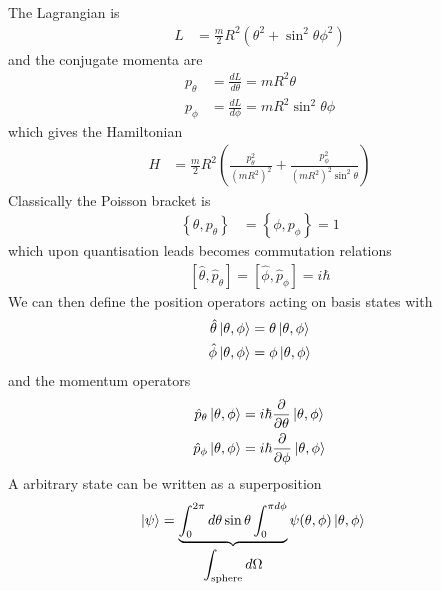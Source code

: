 \begin{example}
    The Lagrangian is
    \begin{align}
        L &=
        \frac{m}{2} R^2\left(
            \theta^2 + \sin^2\theta \phi^2
        \right)
    \end{align}
    and the conjugate momenta are
    \begin{align}
        p_\theta &=
        \frac{dL}{d\theta}
        = mR^2\theta\\
        p_\phi &=
        \frac{dL}{d\phi}
        = mR^2 \sin^2\theta \phi
    \end{align}
    which gives the Hamiltonian
    \begin{align}
        H &=
        \frac{m}{2} R^2\left(
            \frac{p_\theta^2}{(mR^2)^2}
            + \frac{p_\phi^2}{(mR^2)^2\sin^2\theta}
        \right)
    \end{align}
    Classically the Poisson bracket is
    \begin{align}
        \left\{ \theta, p_\theta \right\} &=
        \left\{ \phi, p_\phi \right\}
        = 1
    \end{align}
    which upon quantisation leads becomes commutation relations
    \begin{align}
        \left[ \hat{\theta}, \hat{p}_\theta \right] =
        \left[ \hat{\phi}, \hat{p}_\phi \right] =
        i\hbar
    \end{align}
    We can then define the position operators acting on basis states with
    \begin{align}
        \hat{\theta}\ket{\theta,\phi} &= 
        \theta\ket{\theta,\phi}\\
        \hat{\phi}\ket{\theta,\phi} &= 
        \phi\ket{\theta,\phi}
    \end{align}
    and the momentum operators
    \begin{align}
        \hat{p}_\theta\ket{\theta,\phi}
        &=
        i\hbar \frac{\partial}{\partial\theta}\ket{\theta,\phi}\\
        \hat{p}_\phi\ket{\theta,\phi}
        &=
        i\hbar \frac{\partial}{\partial\phi}\ket{\theta,\phi}
    \end{align}
    A arbitrary state can be written as a superposition
    \begin{align}
        \ket{\psi} &=
        \underbrace{
            \int_{0}^{2\pi} d\theta\sin\theta
            \int_0^{\pi d\phi}
        }_{\displaystyle\int_{\textrm{sphere}} d\Omega}
        \psi(\theta,\phi) \ket{\theta,\phi}

\end{align}
\end{example}
